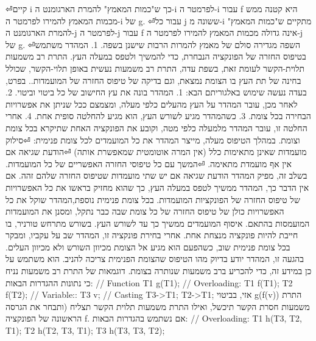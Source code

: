       \begin{ציינון}
⏎קיים i כך ש"כמות המאמץ" להמרת הארגומנט ה-i לפרמטר ה-i עבור f היא קטנה ממש מכמות המאמץ להמירו לפרמטר ה-i של g.
⏎עבור כל j ששונה מ-i מתקיים ש"כמות המאמץ" להמרת הארגומנט ה-j לפרמטר ה-j עבור f אינה גדולה מכמות המאמץ להמירו לפרמטר ה-j של g.
⏎השפה מגדירה סולם של מאמץ להמרות הרבות שישנן בשפה.
      1. המהדר משתמש בטיפוס החזרה של הפונקציה הנבחרת, כדי להמשיך ולטפס במעלה העץ.
      התרת רב משמעות תלוית-הקשר
      לעומת זאת, בשפת עדה, התרת רב משמעות נעשית באופן תלוי-הקשר, שכולל בחינה של תת העץ בו הצומת נמצאת, וגם בדיקה של טיפוס החזרה של המועמדות.. בפרט, בעדה נעשה שימוש באלגוריתם הבא:
      1. המהדר בונה את עץ החישוב של כל ביטוי וביטוי.
      2. לאחר מכן, עובר המהדר על העץ מהעלים כלפי מעלה, ומצמצם ככל שניתן את אפשרויות הבחירה בכל צומת.
      3. כשהמהדר מגיע לשורש העץ, הוא מגיע להחלטה סופית אחת.
      4. אחרי החלטה זו, עובר המהדר מלמעלה כלפי מטה, וקובע את הפונקציה האחת שתיקרא בכל צומת וצומת.
      במהלך הטיפוס מעלה, מייצר המהדר את כל המועמדים לכל צומת פנימית:
⏎סילוק מועמדות שאינן מתאימות כלל (אין המרה אוטומטית שמאפשרת אותה)
⏎הודעת שגיאה אם אין אף מועמדת מתאימה.
⏎המשך עם כל טיפוסי החזרה האפשריים של כל המועמדות.
      בשלב זה, מפיק המהדר הודעת שגיאה אם יש שתי מועמדות שטיפוס החזרה שלהם זהה. אם אין הדבר כך, המהדר ממשיך לטפס במעלה העץ, כך שהוא מחזיק בראשו את כל האפשרויות של טיפוס החזרה של הפונקציות המועמדות. בכל צומת פנימית נוספת,המהדר שוקל את כל האפשרויות כולן של טיפוס החזרה של כל צומת שבה כבר נתקל, ומסנן את המועמדות המועמסות בהתאם.
      איסוף המועמדים ממשיך כך עד לשורש העץ. בשורש מתרחש טורניר, בו חייבת להיות פונקציה מנצחת אחת. אחרי בחירת פונקציה זו, המהדר שב על עקביו, ומבקר בכל צומת פנימית שוב, כשהפעם הוא מגיע אל הצומת מכיוון השורש ולא מכיוון העלים. בהגעה זו, המהדר יודע בדיוק מהו הטיפוס שהצומת הפנימית צריכה להניב. הוא משתמש על כן במידע זה, כדי להכריע ברב משמעות שנותרה בצומת.
      דוגמאות של התרת רב משמעות
      נניח כי נתונות ההגדרות הבאות:
      // Function
      T1 g(T1);
      // Overloading:
      T1 f(T1);
      T2 f(T2);
      // Variable::
      T3 v;
      // Casting
      T3->T1;
      T2->T1;
      אזי, בביטוי
      g(f(v))
      התרת משמעות חסרת הקשר תיכשל, ואילו התרת משמעות תלוית הקשר תצליח (ותבחר את הגרסה הראשונה של הפונקציה f.
      אם נשתמש בהגדרות הבאות:
      // Overloading:
      T1 h(T3, T2, T1);
      T2 h(T2, T3, T1);
      T3 h(T3, T3, T2);
  \end{ציינון}

